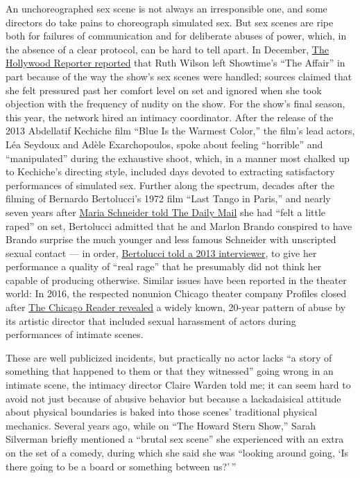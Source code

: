 An unchoreographed sex scene is not always an irresponsible one, and
some directors do take pains to choreograph simulated sex. But sex
scenes are ripe both for failures of communication and for deliberate
abuses of power, which, in the absence of a clear protocol, can be hard
to tell apart. In December,
\href{https://www.hollywoodreporter.com/features/ruth-wilson-left-affair-hostile-environment-nudity-issues-1263553}{The
Hollywood Reporter reported} that Ruth Wilson left Showtime's ``The
Affair'' in part because of the way the show's sex scenes were handled;
sources claimed that she felt pressured past her comfort level on set
and ignored when she took objection with the frequency of nudity on the
show. For the show's final season, this year, the network hired an
intimacy coordinator. After the release of the 2013 Abdellatif Kechiche
film ``Blue Is the Warmest Color,'' the film's lead actors, Léa Seydoux
and Adèle Exarchopoulos, spoke about feeling ``horrible'' and
``manipulated'' during the exhaustive shoot, which, in a manner most
chalked up to Kechiche's directing style, included days devoted to
extracting satisfactory performances of simulated sex. Further along the
spectrum, decades after the filming of Bernardo Bertolucci's 1972 film
``Last Tango in Paris,'' and nearly seven years after
\href{https://www.dailymail.co.uk/tvshowbiz/article-469646/I-felt-raped-Brando.html}{Maria
Schneider told The Daily Mail} she had ``felt a little raped'' on set,
Bertolucci admitted that he and Marlon Brando conspired to have Brando
surprise the much younger and less famous Schneider with unscripted
sexual contact --- in order,
\href{https://www.youtube.com/watch?v=RMl4xCGcdfA}{Bertolucci told a
2013 interviewer}, to give her performance a quality of ``real rage''
that he presumably did not think her capable of producing otherwise.
Similar issues have been reported in the theater world: In 2016, the
respected nonunion Chicago theater company Profiles closed after
\href{https://www.chicagoreader.com/chicago/profiles-theatre-theater-abuse-investigation/Content?oid=22415861}{The
Chicago Reader revealed} a widely known, 20-year pattern of abuse by its
artistic director that included sexual harassment of actors during
performances of intimate scenes.

These are well publicized incidents, but practically no actor lacks ``a
story of something that happened to them or that they witnessed'' going
wrong in an intimate scene, the intimacy director Claire Warden told me;
it can seem hard to avoid not just because of abusive behavior but
because a lackadaisical attitude about physical boundaries is baked into
those scenes' traditional physical mechanics. Several years ago, while
on ``The Howard Stern Show,'' Sarah Silverman briefly mentioned a
``brutal sex scene'' she experienced with an extra on the set of a
comedy, during which she said she was ``looking around going, `Is there
going to be a board or something between us?' ''

